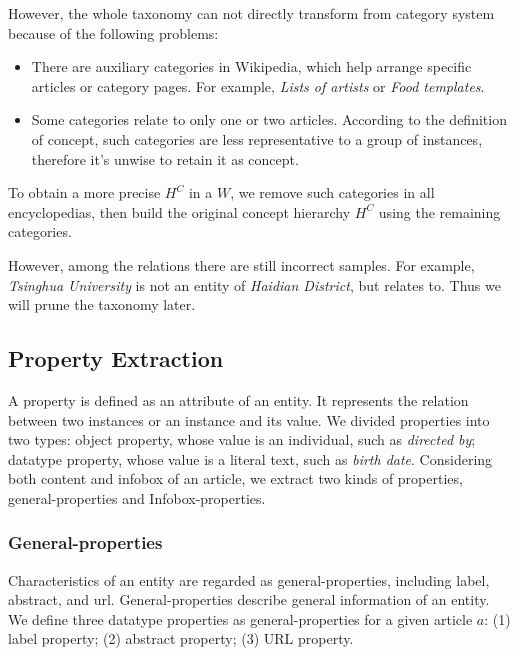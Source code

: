\documentclass[runningheads,a4paper]{llncs}
\begin{document}
However, the whole taxonomy can not directly transform from category system because of the following problems:
\begin{itemize}
    \item There are auxiliary categories in Wikipedia, which help arrange specific articles or category pages. For example, \emph{Lists of artists} or \emph{Food templates}.
    \item Some categories relate to only one or two articles. According to the definition of concept, such categories are less representative to a group of instances, therefore it's unwise to retain it as concept.
\end{itemize}
   To obtain a more precise $H^C$ in a $W$, we remove such categories in all encyclopedias, then build the original concept hierarchy $H^C$ using the remaining categories.  

However, among the relations there are still incorrect samples. For example, \emph{Tsinghua University} is not an entity of \emph{Haidian District}, but relates to. Thus we will prune the taxonomy later.

\subsection{Property Extraction}
\label{sec:pe}
A property is defined as an attribute of an entity. It represents the relation between two instances or an instance and its value. We divided properties into two types: object property, whose value is an individual, such as \emph{directed by}; datatype property, whose value is a literal text, such as \emph{birth date}. Considering both content and infobox of an article, we extract two kinds of properties, general-properties and Infobox-properties.

\subsubsection{General-properties}
Characteristics of an entity are regarded as general-properties, including label, abstract, and url. General-properties describe general information of an entity. We define three datatype properties as general-properties for a given article $a$: (1) label property; (2) abstract property; (3) URL property.
\end{document}
